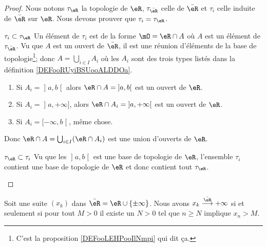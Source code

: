 \begin{proof}
	Nous notons \( \tau_{\eR}\) la topologie de \( \eR\), \( \tau_{\bar \eR}\) celle de \( \bar \eR\) et \( \tau_i\) celle induite de \( \bar \eR\) sur \( \eR\). Nous devons prouver que \( \tau_i=\tau_{\eR}\).

	\begin{subproof}
		\item[\( \tau_i\subset\tau_{\eR}\)]
		Un élément de \( \tau_i\) est de la forme \( \mO=\eR\cap A\) où \( A\) est un élément de \( \tau_{\bar \eR}\). Vu que \( A\) est un ouvert de \( \bar \eR\), il est une réunion d'éléments de la base de topologie\footnote{C'est la proposition \ref{DEFooLEHPooIlNmpi} qui dit ça.}; donc \( A=\bigcup_{i\in I}A_i\) où les \( A_i\) sont des trois types listés dans la définition \ref{DEFooRUyiBSUooALDDOa}.
		\begin{enumerate}
			\item
			      Si \( A_i=\mathopen] a , b \mathclose[\) alors \( \eR\cap A=\mathopen] a , b \mathclose[\) est un ouvert de \( \eR\).
			\item Si \( A_i=\mathopen] a , +\infty \mathclose]\), alors \( \eR\cap A_i=\mathopen] a , +\infty \mathclose[\) est un ouvert de \( \eR\).
			\item Si \( A_i=\mathopen[ -\infty , b \mathclose[\), même chose.
		\end{enumerate}
		Donc \( \eR\cap A=\bigcup_{i\in I}(\eR\cap A_i)\) est une union d'ouverts de \( \eR\).
		\item[\( \tau_{\eR}\subset\tau_i\)]
		Vu que les \( \mathopen] a , b \mathclose[\) est une base de topologie de \( \eR\), l'ensemble \( \tau_i\) contient une base de topologie de \( \eR\) et donc contient tout \( \tau_{\eR}\).
	\end{subproof}
\end{proof}

\begin{proposition}
	Soit une suite \( (x_k)\) dans \( \bar \eR=\eR\cup\{ \pm\infty \}\). Nous avons \( x_k\stackrel{\bar \eR}{\longrightarrow}+\infty\) si et seulement si pour tout \( M>0\) il existe un \( N>0\) tel que \( n\geq N\) implique \( x_n>M\).
\end{proposition}

